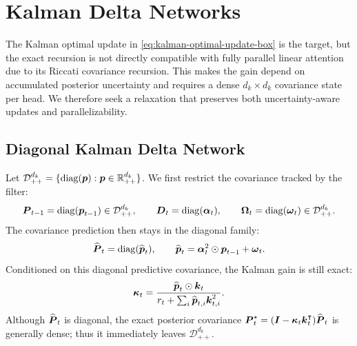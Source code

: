 \documentclass{article} %
\begin{document}
\section{Kalman Delta Networks}
\label{sec:kla}
\vspace{-1mm}

The Kalman optimal update in \eqref{eq:kalman-optimal-update-box} is the target, but the exact
recursion is not directly compatible with fully parallel linear attention due to its Riccati
covariance recursion. This makes the gain depend on accumulated posterior uncertainty and
requires a dense $d_k\times d_k$ covariance state per head. We therefore seek a relaxation that
preserves both uncertainty-aware updates and parallelizability.

\subsection{Diagonal Kalman Delta Network}
\label{sec:diagonal-kdn}

Let $\mathcal{D}_{++}^{d_k}=\{\operatorname{diag}(\boldsymbol{p}):\boldsymbol{p}\in\mathbb{R}_{++}^{d_k}\}$.
We first restrict the covariance tracked by the filter:
\begin{equation}
  \boldsymbol{P}_{t-1}=\operatorname{diag}(\boldsymbol{p}_{t-1})\in\mathcal{D}_{++}^{d_k},
  \qquad
  \boldsymbol{D}_t=\operatorname{diag}(\boldsymbol{\alpha}_t),
  \qquad
  \boldsymbol{\Omega}_t=\operatorname{diag}(\boldsymbol{\omega}_t)\in\mathcal{D}_{++}^{d_k}.
  \label{eq:diag-cov-info}
\end{equation}
The covariance prediction then stays in the diagonal family:
\begin{equation}
  \widehat{\boldsymbol{P}}_t=\operatorname{diag}(\widehat{\boldsymbol{p}}_t),
  \qquad
  \widehat{\boldsymbol{p}}_t
  =\boldsymbol{\alpha}_t^2\odot\boldsymbol{p}_{t-1}+\boldsymbol{\omega}_t.
  \label{eq:diag-covariance-prediction}
\end{equation}
Conditioned on this diagonal predictive covariance, the Kalman gain is still exact:
\begin{equation}
  \boldsymbol{\kappa}_t =
  \frac{\widehat{\boldsymbol{p}}_t\odot \boldsymbol{k}_t}
  {r_t+\sum_i \widehat{\boldsymbol{p}}_{t,i}\boldsymbol{k}_{t,i}^2}.
  \label{eq:diag-kalman-gain}
\end{equation}
Although $\widehat{\boldsymbol{P}}_t$ is diagonal, the exact posterior covariance
$\boldsymbol{P}_t^\star=(\boldsymbol{I}-\boldsymbol{\kappa}_t\boldsymbol{k}_t^{\intercal})\widehat{\boldsymbol{P}}_t$
is generally dense; thus it immediately leaves
$\mathcal{D}_{++}^{d_k}$.
\end{document}
